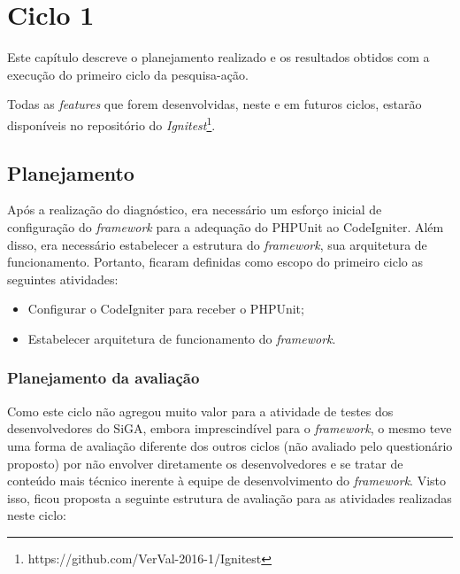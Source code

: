 \chapter{Ciclo 1}
  
  Este capítulo descreve o planejamento realizado e os resultados obtidos com a execução do primeiro ciclo da pesquisa-ação.
  
  Todas as \textit{features} que forem desenvolvidas, neste e em futuros ciclos, estarão disponíveis no repositório do \textit{Ignitest}\footnote{https://github.com/VerVal-2016-1/Ignitest}.
  
  \section{Planejamento}
  
      Após a realização do diagnóstico, era necessário um esforço inicial de configuração do \textit{framework} para a 
      adequação do PHPUnit ao CodeIgniter. Além disso, era necessário estabelecer a estrutura do \textit{framework},
      sua arquitetura de funcionamento. Portanto, ficaram definidas como escopo do primeiro ciclo as seguintes atividades:
      
      \begin{itemize}
    
    \item Configurar o CodeIgniter para receber o PHPUnit;
    
    \item Estabelecer arquitetura de funcionamento do \textit{framework}.
    
      \end{itemize}
      
      
      \subsection{Planejamento da avaliação}
      
      Como este ciclo não agregou muito valor para a atividade de testes dos desenvolvedores do SiGA,
      embora imprescindível para o \textit{framework}, o mesmo teve uma forma de avaliação diferente
      dos outros ciclos (não avaliado pelo questionário proposto) por não envolver diretamente os desenvolvedores e se
      tratar de conteúdo mais técnico inerente à equipe de desenvolvimento do \textit{framework}. Visto isso, ficou proposta
      a seguinte estrutura de avaliação para as atividades realizadas neste ciclo:
      
